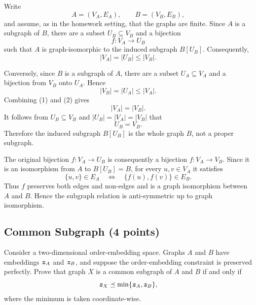 \begin{solution}
Write
\[
  A=(V_A,E_A),\qquad B=(V_B,E_B),
\]
and assume, as in the homework setting, that the graphs are finite.  Since
\(A\) is a subgraph of \(B\), there are a subset
\(U_B\subseteq V_B\) and a bijection
\[
  f:V_A\longrightarrow U_B
\]
such that \(A\) is graph-isomorphic to the induced subgraph \(B[U_B]\).
Consequently,
\[
  |V_A|=|U_B|\leq |V_B|.
  \tag{1}
\]

Conversely, since \(B\) is a subgraph of \(A\), there are a subset
\(U_A\subseteq V_A\) and a bijection from \(V_B\) onto \(U_A\).  Hence
\[
  |V_B|=|U_A|\leq |V_A|.
  \tag{2}
\]
Combining (1) and (2) gives
\[
  |V_A|=|V_B|.
\]
It follows from \(U_B\subseteq V_B\) and
\(|U_B|=|V_A|=|V_B|\) that
\[
  U_B=V_B.
\]
Therefore the induced subgraph \(B[U_B]\) is the whole graph \(B\), not a
proper subgraph.

The original bijection \(f:V_A\to U_B\) is consequently a bijection
\(f:V_A\to V_B\).  Since it is an isomorphism from \(A\) to \(B[U_B]=B\),
for every \(u,v\in V_A\) it satisfies
\[
  \{u,v\}\in E_A
  \quad\Longleftrightarrow\quad
  \{f(u),f(v)\}\in E_B.
\]
Thus \(f\) preserves both edges and non-edges and is a graph isomorphism
between \(A\) and \(B\).  Hence the subgraph relation is anti-symmetric up to
graph isomorphism.
\end{solution}

\subsection{Common Subgraph (4 points)}

Consider a two-dimensional order-embedding space. Graphs \(A\) and \(B\) have
embeddings \(\bm{z}_A\) and \(\bm{z}_B\), and suppose the order-embedding
constraint is preserved perfectly. Prove that graph \(X\) is a common subgraph
of \(A\) and \(B\) if and only if
\[
  \bm{z}_X\preceq
  \min\{\bm{z}_A,\bm{z}_B\},
\]
where the minimum is taken coordinate-wise.

